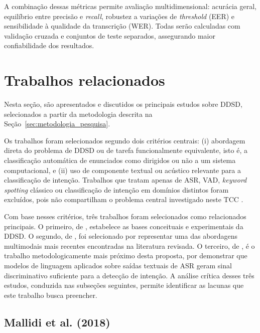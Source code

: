 \documentclass[
    12pt,                %
    openright,           %
    oneside,             %
    a4paper,             %
    english,             %
    brazil               %
]{abntex2}
\begin{document}
A combinação dessas métricas permite avaliação multidimensional: acurácia geral, equilíbrio entre precisão e \textit{recall}, robustez a variações de \textit{threshold} (EER) e sensibilidade à qualidade da transcrição (WER). Todas serão calculadas com validação cruzada e conjuntos de teste separados, assegurando maior confiabilidade dos resultados.


\section{Trabalhos relacionados}
\label{sec:trabalhos_relacionados}

Nesta seção, são apresentados e discutidos os principais estudos sobre DDSD, selecionados a partir da metodologia descrita na Seção~\ref{sec:metodologia_pesquisa}.

Os trabalhos foram selecionados segundo dois critérios centrais: (i) abordagem direta do problema de DDSD ou de tarefa funcionalmente equivalente, isto é, a classificação automática de enunciados como dirigidos ou não a um sistema computacional, e (ii) uso de componente textual ou acústico relevante para a classificação de intenção. Trabalhos que tratam apenas de ASR, VAD, \textit{keyword spotting} clássico ou classificação de intenção em domínios distintos foram excluídos, pois não compartilham o problema central investigado neste TCC \cite{Wazlawick2020}.

Com base nesses critérios, três trabalhos foram selecionados como relacionados principais. O primeiro, de , estabelece as bases conceituais e experimentais da DDSD. O segundo, de , foi selecionado por representar uma das abordagens multimodais mais recentes encontradas na literatura revisada. O terceiro, de , é o trabalho metodologicamente mais próximo desta proposta, por demonstrar que modelos de linguagem aplicados sobre saídas textuais de ASR geram sinal discriminativo suficiente para a detecção de intenção. A análise crítica desses três estudos, conduzida nas subseções seguintes, permite identificar as lacunas que este trabalho busca preencher.


\subsection{Mallidi et al. (2018)}
\end{document}
